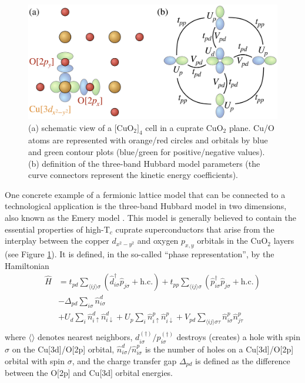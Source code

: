 \begin{figure}[h!]
\centering
\includegraphics[width=\columnwidth]{groups/2._Use_case_discovery/lattice.png}
\caption{(a) schematic view of a [CuO$_2]_4$ cell in a cuprate CuO$_2$ plane. Cu/O atoms are represented with orange/red circles and orbitals by blue and green contour plots (blue/green for positive/negative values). (b) definition of the three-band Hubbard model parameters (the curve connectors represent the kinetic energy coefficients).
}
\label{fig:lattice}
\end{figure}

One concrete example of a fermionic lattice model that can be connected to a technological application is the three-band Hubbard model in two dimensions, also known as the Emery model \cite{emery1987theory}. 
This model is generally believed to contain the essential properties of high-T$_c$ cuprate superconductors that arise from the interplay between the copper $d_{x^2-y^2}$ and oxygen $p_{x,y}$ orbitals in the CuO$_2$ layers (see Figure \ref{fig:lattice}). It is defined, in the so-called ``phase representation'', by the Hamiltonian
\begin{equation}
\label{eq:emery}
\begin{split}
\hat{H} &= 
t_{pd} \sum_{\langle ij \rangle \sigma} (\hat{d}^\dagger_{i\sigma} \hat{p}_{j\sigma} + \mathrm{h.c.} )
+ t_{pp} \sum_{\langle ij \rangle \sigma} (\hat{p}^\dagger_{i\sigma} \hat{p}_{j\sigma} + \mathrm{h.c.} ) \\
&- \Delta_{pd} \sum_{i\sigma} \hat{n}^d_{i \sigma} \\
&+ U_d \sum_i \hat{n}^d_{i\uparrow} \hat{n}^d_{i\downarrow} 
+ U_p \sum_i \hat{n}^p_{i\uparrow} \hat{n}^p_{i\downarrow} 
+ V_{pd}  \sum_{\langle ij \rangle \sigma \tau}  \hat{n}^p_{i\sigma} \hat{n}^p_{j\tau} \, \\
\end{split}
\end{equation}
where $\langle \rangle$ denotes nearest neighbors, $d^{(\dagger)}_{i\sigma}/p^{(\dagger)}_{i\sigma}$ destroys (creates) a hole with spin $\sigma$ on the Cu[3d]/O[2p] orbital, $\hat{n}^d_{i\sigma}/\hat{n}^p_{i\sigma}$ is the number of holes on a Cu[3d]/O[2p] orbital with spin $\sigma$, and the charge transfer gap $\Delta_{pd}$ is defined as the difference between the O[2p] and Cu[3d] orbital energies.

